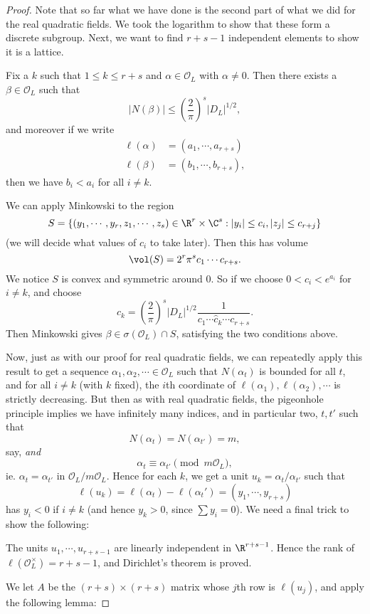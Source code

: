 \documentclass[a4paper]{article}
\begin{document}
\begin{proof}
  Note that so far what we have done is the second part of what we did for the real quadratic fields. We took the logarithm to show that these form a discrete subgroup. Next, we want to find $r + s - 1$ independent elements to show it is a lattice.

  \begin{claim}
    Fix a $k$ such that $1 \leq k \leq r + s$ and $\alpha \in \mathcal{O}_L$ with $\alpha \not= 0$. Then there exists a $\beta \in \mathcal{O}_L$ such that
    \[
      |N(\beta)| \leq \left(\frac{2}{\pi}\right)^s |D_L|^{1/2},
    \]
    and moreover if we write
    \begin{align*}
      \ell(\alpha) &= (a_1, \cdots, a_{r + s})\\
      \ell(\beta) &= (b_1, \cdots, b_{r + s}),
    \end{align*}
    then we have $b_i < a_i$ for all $i \not= k$.
  \end{claim}
  We can apply Minkowski to the region
  \[
    S = \{(y_1, \cdots, y_r, z_1, \cdots, z_s) \in \R^r \times \C^s: |y_i| \leq c_i, |z_j| \leq c_{r + j}\}
  \]
  (we will decide what values of $c_i$ to take later). Then this has volume
  \[
    \vol(S) = 2^r \pi^s c_1 \cdots c_{r + s}.
  \]
  We notice $S$ is convex and symmetric around $0$. So if we choose $0 < c_i < e^{a_i}$ for $i \not= k$, and choose
  \[
    c_k = \left(\frac{2}{\pi}\right)^s |D_L|^{1/2} \frac{1}{c_1 \cdots \hat{c}_k \cdots c_{r + s}}.
  \]
  Then Minkowski gives $\beta \in \sigma(\mathcal{O}_L) \cap S$, satisfying the two conditions above.

  Now, just as with our proof for real quadratic fields, we can repeatedly apply this result to get a sequence $\alpha_1, \alpha_2, \cdots \in \mathcal{O}_L$ such that $N(\alpha_t)$ is bounded for all $t$, and for all $i \not= k$ (with $k$ fixed), the $i$th coordinate of $\ell(\alpha_1), \ell(\alpha_2), \cdots$ is strictly decreasing. But then as with real quadratic fields, the pigeonhole principle implies we have infinitely many indices, and in particular two, $t, t'$ such that
  \[
    N(\alpha_t) = N(\alpha_{t'}) = m,
  \]
  say, \emph{and}
  \[
    \alpha_t \equiv \alpha_{t'} \pmod {m\mathcal{O}_L},
  \]
  ie. $\alpha_t = \alpha_{t'}$ in $\mathcal{O}_L/m\mathcal{O}_L$. Hence for each $k$, we get a unit $u_k = \alpha_t/\alpha_{t'}$ such that
  \[
    \ell(u_k) = \ell(\alpha_t) - \ell(\alpha_t') = (y_1, \cdots, y_{r + s})
  \]
  has $y_i < 0$ if $i \not= k$ (and hence $y_k > 0$, since $\sum y_i = 0$). We need a final trick to show the following:
  \begin{claim}
    The units $u_1, \cdots, u_{r + s - 1}$ are linearly independent in $\R^{r + s - 1}$. Hence the rank of $\ell(\mathcal{O}_L^\times) = r + s - 1$, and Dirichlet's theorem is proved.
  \end{claim}
  We let $A$ be the $(r + s)\times (r + s)$ matrix whose $j$th row is $\ell(u_j)$, and apply the following lemma:


\end{proof}
\end{document}
